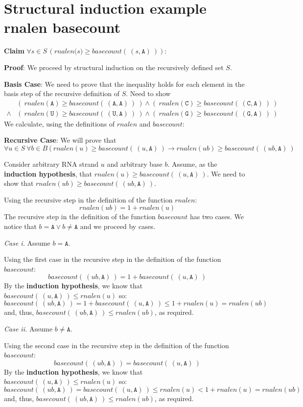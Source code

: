 \documentclass[12pt, oneside]{article}
\newcommand{\A}[0]{\texttt{A}}
\newcommand{\C}[0]{\texttt{C}}
\newcommand{\G}[0]{\texttt{G}}
\newcommand{\U}[0]{\texttt{U}}
\begin{document}
\section*{Structural induction example rnalen basecount}


{\bf Claim} $\forall s \in S \, (\textit{rnalen(s)} \geq \textit{basecount}(~(s, \A)~))$:

{\bf Proof}: We proceed by structural induction on the recursively defined set $S$.

{\bf Basis  Case}: We need to prove that 
the inequality holds for each element in the basis step of the recursive
definition of $S$. 
Need to show 
\begin{align*}
          &(~ rnalen(\A) \geq basecount(~(\A, \A)~)~) \land (~ rnalen(\C) \geq basecount(~(\C, \A)~)~) \\
    \land & (~ rnalen(\U) \geq basecount(~(\U, \A)~)~) \land (~ rnalen(\G) \geq basecount(~(\G, \A)~)~)
\end{align*}
We calculate, using the definitions of $rnalen$ and $basecount$:

\vspace{100pt}

{\bf Recursive Case}: We will prove that 
\[
    \forall u \in S ~\forall b \in B ~( ~rnalen(u) \geq basecount(~(u, \A)~) \to 
    rnalen(ub) \geq basecount(~(ub, \A)~)
\]

Consider arbitrary RNA strand $u$ and arbitrary base $b$. Assume, as the {\bf induction hypothesis},
that $rnalen(u) \geq basecount(~(u,\A)~)$. We need to show that $rnalen(ub) \geq basecount(~(ub, \A)~)$.

Using the recursive step in the definition of the function $rnalen$:
\[
    rnalen(ub) = 1 + rnalen(u)
\]
The recursive step in the definition of the function $basecount$ has two cases. We notice that 
$b = \A \lor b \neq \A$ and we proceed by cases.

{\it Case i.} Assume $b = \A$.

Using the first case in the recursive step in the definition of the function $basecount$:
\[
    basecount(~(ub, \A)~) = 1 + basecount(~(u,\A)~)
\]
By the {\bf induction hypothesis}, we know that $basecount(~(u,\A)~) \leq rnalen(u)$ so:
\[
    basecount(~(ub, \A)~) = 1 + basecount(~(u,\A)~) \leq 1 + rnalen(u) = rnalen (ub)
\]
and, thus, $basecount(~(ub,\A)~) \leq rnalen(ub)$, as required.

{\it Case ii.} Assume $b \neq \A$. 

Using the second case in the recursive step in the definition of the function $basecount$:
\[
    basecount(~(ub, \A)~) = basecount(~(u,\A)~)
\]
By the {\bf induction hypothesis}, we know that $basecount(~(u,\A)~) \leq rnalen(u)$ so:
\[
    basecount(~(ub, \A)~) = basecount(~(u,\A)~) \leq rnalen(u) < 1 + rnalen(u) = rnalen (ub)
\]
and, thus, $basecount(~(ub,\A)~) \leq rnalen(ub)$, as required.
 \vfill
\end{document}
